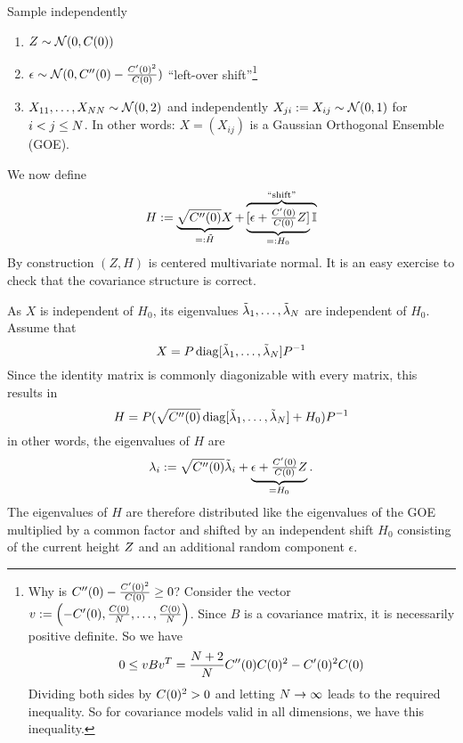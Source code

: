 Sample independently
\begin{enumerate}
	\item \(Z\sim\mathcal{N}(0, C(0))\)
	\item \(\epsilon \sim \mathcal{N}(0, C''(0) - \frac{C'(0)^2}{C(0)})\)
	``left-over shift''\footnote{
		Why is \(C''(0) - \frac{C'(0)^2}{C(0)} \ge 0\)? Consider the
		vector \(v:=\left(-C'(0), \frac{C(0)}{N}, \dots,
		\frac{C(0)}{N}\right)\).  Since \(B\) is a covariance matrix, it
		is necessarily positive definite.
		So we have
		\[
			0 \le v B v^T
			= \frac{N+2}{N}C''(0)C(0)^2 - C'(0)^2C(0)
		\]
		Dividing both sides by \(C(0)^2 > 0\) and letting \(N\to\infty\)
		leads to the required inequality. So for covariance models valid in all
		dimensions, we have this inequality.
	}
	\item \(X_{11},\dots,X_{NN}\sim\mathcal{N}(0, 2)\) and
	independently \(X_{ji}:=X_{ij}\sim\mathcal{N}(0,1)\) for \(i<j\le N\).
	In other words: \(X = (X_{ij})\) is a Gaussian Orthogonal Ensemble (GOE).
\end{enumerate}
We now define
\[
	H := \underbrace{\sqrt{C''(0)}X}_{=:\tilde{H}}
	+ \overbrace{\underbrace{[\epsilon + \tfrac{C'(0)}{C(0)} Z]}_{=:H_0}\mathbb{I}}^{\text{``shift''}}
\]
By construction \((Z,H)\) is centered multivariate normal. It is an easy
exercise to check that the covariance structure is correct.

As \(X\) is independent of \(H_0\), its eigenvalues
\(\tilde{\lambda}_1,\dots,\tilde{\lambda}_N\) are independent of
\(H_0\). Assume that
\[
	X = P\operatorname{diag}[\tilde{\lambda}_1,\dots,\tilde{\lambda}_N]P^{-1}
\]
Since the identity matrix is commonly diagonizable with every matrix, this
results in
\[
	H = P(\sqrt{C''(0)} \operatorname{diag}[\tilde{\lambda}_1,\dots,\tilde{\lambda}_N] + H_0) P^{-1}
\]
in other words, the eigenvalues of \(H\) are
\[
	\lambda_i
	:= \sqrt{C''(0)}\tilde{\lambda}_i + \underbrace{\epsilon + \tfrac{C'(0)}{C(0)}Z}_{=H_0}.
\]
The eigenvalues of \(H\) are therefore distributed like the eigenvalues of the
GOE multiplied by a common factor and shifted by an independent shift \(H_0\)
consisting of the current height \(Z\) and an additional random component
\(\epsilon\).

